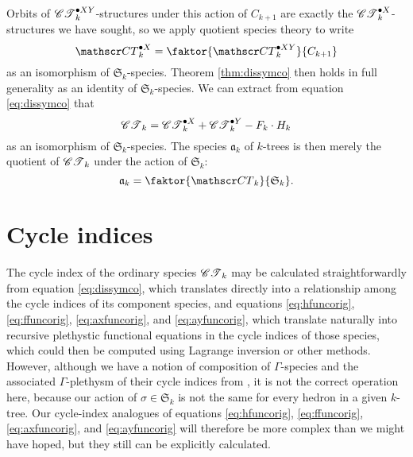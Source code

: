 \documentclass[sectionflow,singlespace,twoside,boldmathhdr]{brandiss} %
\numberwithin{section}{chapter}
\numberwithin{figure}{chapter}
\begin{document}
Orbits of $\pointed[XY]{\specname{CT}}_{k}$-structures under this action of $C_{k+1}$ are exactly the $\pointed[X]{\specname{CT}}_{k}$-structures we have sought, so we apply quotient species theory to write
\begin{equation}
  \label{eq:cycquot}
  \pointed[X]{\specname{CT}}_{k} = \faktor{\pointed[XY]{\specname{CT}}_{k}}{C_{k+1}}
\end{equation}
as an isomorphism of $\mathfrak{S}_{k}$-species.
Theorem \ref{thm:dissymco} then holds in full generality as an identity of $\mathfrak{S}_{k}$-species.
We can extract from equation \eqref{eq:dissymco} that
\begin{equation}
  \label{eq:coskextract}
  \specname{CT}_{k} = \pointed[X]{\specname{CT}}_{k} + \pointed[Y]{\specname{CT}}_{k} - F_{k} \cdot H_{k}
\end{equation}
as an isomorphism of $\mathfrak{S}_{k}$-species.
The species $\mathfrak{a}_{k}$ of $k$-trees is then merely the quotient of $\specname{CT}_{k}$ under the action of $\mathfrak{S}_{k}$:
\begin{equation}
  \label{eq:ktreesquot}
  \mathfrak{a}_{k} = \faktor{\specname{CT}_{k}}{\mathfrak{S}_{k}}.
\end{equation}

\section{Cycle indices}\label{s:ktcycind}
The cycle index of the ordinary species $\specname{CT}_{k}$ may be calculated straightforwardly from equation \eqref{eq:dissymco}, which translates directly into a relationship among the cycle indices of its component species, and equations \eqref{eq:hfuncorig}, \eqref{eq:ffuncorig}, \eqref{eq:axfuncorig}, and \eqref{eq:ayfuncorig}, which translate naturally into recursive plethystic functional equations in the cycle indices of those species, which could then be computed using Lagrange inversion or other methods.
However, although we have a notion of composition of $\Gamma$-species and the associated $\Gamma$-plethysm of their cycle indices from \cite[\S 3]{hend:specfield}, it is not the correct operation here, because our action of $\sigma \in \mathfrak{S}_{k}$ is not the same for every hedron in a given $k$-tree.
Our cycle-index analogues of equations \eqref{eq:hfuncorig}, \eqref{eq:ffuncorig}, \eqref{eq:axfuncorig}, and \eqref{eq:ayfuncorig} will therefore be more complex than we might have hoped, but they still can be explicitly calculated.
\end{document}
